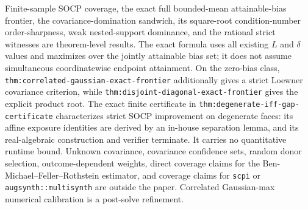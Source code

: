 \documentclass{article}
\begin{document}
Finite-sample SOCP coverage, the exact full bounded-mean attainable-bias frontier, the covariance-domination sandwich, its square-root condition-number order-sharpness, weak nested-support dominance, and the rational strict witnesses are theorem-level results. The exact formula uses all existing \(L\) and \(\delta\) values and maximizes over the jointly attainable bias set; it does not assume simultaneous coordinatewise endpoint attainment. On the zero-bias class, \texttt{thm:correlated-gaussian-exact-frontier} additionally gives a strict Loewner covariance criterion, while \texttt{thm:disjoint-diagonal-exact-frontier} gives the explicit product root. The exact finite certificate in \texttt{thm:degenerate-iff-gap-certificate} characterizes strict SOCP improvement on degenerate faces: its affine exposure identities are derived by an in-house separation lemma, and its real-algebraic construction and verifier terminate. It carries no quantitative runtime bound. Unknown covariance, covariance confidence sets, random donor selection, outcome-dependent weights, direct coverage claims for the Ben-Michael--Feller--Rothstein estimator, and coverage claims for \texttt{scpi} or \texttt{augsynth::multisynth} are outside the paper. Correlated Gaussian-max numerical calibration is a post-solve refinement.
\end{document}
